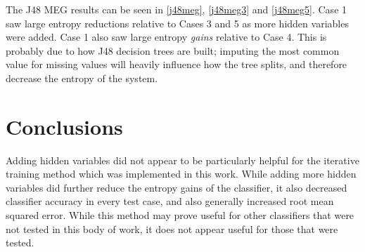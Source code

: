 The J48 MEG results can be seen in \ref{j48meg}, \ref{j48meg3} and \ref{j48meg5}. Case 1 saw large entropy reductions relative to Cases 3 and 5 as more hidden variables were added. Case 1 also saw large entropy \textit{gains} relative to Case 4. This is probably due to how J48 decision trees are built; imputing the most common value for missing values will heavily influence how the tree splits, and therefore decrease the entropy of the system.

\linespread{1.0}








\linespread{1.3}

\section{Conclusions}

Adding hidden variables did not appear to be particularly helpful for the iterative training method which was implemented in this work. While adding more hidden variables did further reduce the entropy gains of the classifier, it also decreased classifier accuracy in every test case, and also generally increased root mean squared error. While this method may prove useful for other classifiers that were not tested in this body of work, it does not appear useful for those that were tested.